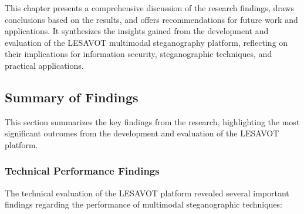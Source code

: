 \documentclass[12pt, a4paper, oneside]{book}
\begin{document}
This chapter presents a comprehensive discussion of the research findings, draws conclusions based on the results, and offers recommendations for future work and applications. It synthesizes the insights gained from the development and evaluation of the LESAVOT multimodal steganography platform, reflecting on their implications for information security, steganographic techniques, and practical applications.

\subsection{Summary of Findings}

This section summarizes the key findings from the research, highlighting the most significant outcomes from the development and evaluation of the LESAVOT platform.

\subsubsection{Technical Performance Findings}

The technical evaluation of the LESAVOT platform revealed several important findings regarding the performance of multimodal steganographic techniques:
\end{document}

